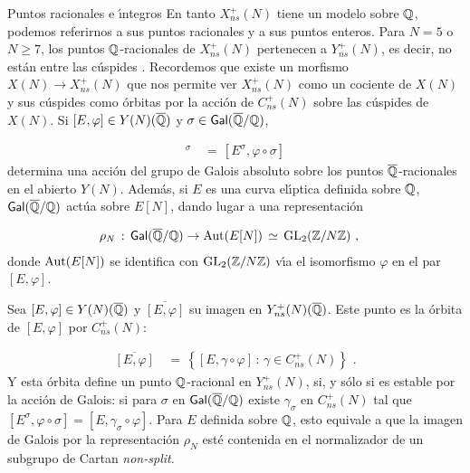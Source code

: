 \begin{subsection}{Puntos racionales e \'{\i}ntegros}\label{subsec:puntosRacionalesYEnteros}
 En tanto $X_{ns}^{+}(N)$ tiene un modelo sobre $\bb{Q}$, podemos referirnos a sus
 puntos racionales y a sus puntos enteros. Para $N=5$ o $N\geq 7$, los puntos
 $\bb{Q}$-racionales de $X_{ns}^{+}(N)$ pertenecen a $Y_{ns}^{+}(N)$, es decir,
 no est\'{a}n entre las c\'{u}spides \cite{baranNormalizers}. Recordemos que
 existe un morfismo $X(N)\rightarrow X_{ns}^{+}(N)$ que nos permite ver
 $X_{ns}^{+}(N)$ como un cociente de $X(N)$ y sus c\'{u}spides como \'{o}rbitas
 por la acci\'{o}n de $C_{ns}^{+}(N)$ sobre las c\'{u}spides de $X(N)$. Si
 $[E,\varphi]\in Y(N)(\overline{\bb{Q}})$ y $\sigma\in\absGal{\bb{Q}}$,
 
 \begin{align*}
  [E,\varphi]^{\sigma} & \,=\,[E^{\sigma},\varphi\circ\sigma]
 \end{align*}
determina una acci\'{o}n del grupo de Galois absoluto sobre los puntos
$\overline{\bb{Q}}$-racionales en el abierto $Y(N)$. Adem\'{a}s, si $E$ es una
curva el\'{\i}ptica definida sobre $\bb{Q}$, $\absGal{\bb{Q}}$ act\'{u}a sobre
$E[N]$, dando lugar a una representaci\'{o}n

 \begin{align*}
  \rho_{N} & \,:\,\absGal{\bb{Q}}\rightarrow\rm{Aut}(E[N])
  \,\simeq\,\GL{2}(\bb{Z}/N\bb{Z})\text{ ,}
 \end{align*}
donde $\rm{Aut}(E[N])$ se identifica con $\GL{2}(\bb{Z}/N\bb{Z})$ v\'{\i}a
el isomorfismo $\varphi$ en el par $[E,\varphi]$.

 Sea $[E,\varphi]\in Y(N)(\overline{\bb{Q}})$ y $\overline{[E,\varphi]}$ su
 imagen en $Y_{ns}^{+}(N)(\overline{\bb{Q}})$. Este punto es la \'{o}rbita
 de $[E,\varphi]$ por $C_{ns}^{+}(N)$:

 \begin{align*}
  \overline{[E,\varphi]} & \,=\,\left\lbrace
  [E,\gamma\circ\varphi]\,:\,\gamma\in C_{ns}^{+}(N)\right\rbrace
  \text{ .}
 \end{align*}
Y esta \'{o}rbita define un punto $\bb{Q}$-racional en $Y_{ns}^{+}(N)$, si,
y s\'{o}lo si es estable por la acci\'{o}n de Galois: si para $\sigma$ en
$\absGal{\bb{Q}}$ existe $\gamma_{\sigma}$ en $C_{ns}^{+}(N)$ tal que
$[E^{\sigma},\varphi\circ\sigma]=[E,\gamma_{\sigma}\circ\varphi]$. Para $E$
definida sobre $\bb{Q}$, esto equivale a que la imagen de Galois por la
representaci\'{o}n $\rho_{N}$ est\'{e} contenida en el normalizador de un
subgrupo de Cartan \textit{non-split}.


\end{subsection}
